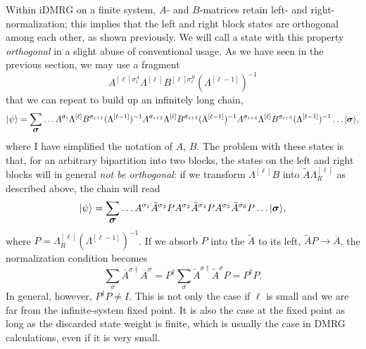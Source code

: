 \documentclass[a4paper,10pt,oneside,onecolumn,1p,times]{elsarticle}
\newcommand{\ket}[1]{\mbox{$| #1  \rangle$}}
\newcommand{\fat}[1]{\mbox{\boldmath$#1$\unboldmath}}	%
\begin{document}
Within iDMRG on a finite system, $A$- and $B$-matrices retain left- and right-normalization; this implies that the left and right block states are orthogonal among each other, as shown previously. We will call a state with this property {\em orthogonal} in a slight abuse of conventional usage. As we have seen in the previous section, we may use a fragment 
\begin{equation}
A^{[\ell]\sigma_\ell^A}\Lambda^{[\ell]} B^{[\ell]\sigma_\ell^B} (\Lambda^{[\ell-1]})^{-1}
\end{equation}
that we can repeat to build up an infinitely long chain,
\begin{equation}
\ket{\psi} = \sum_{\fat{\sigma}} \ldots A^{\sigma_i}\Lambda^{[\ell]} B^{\sigma_{i+1}} (\Lambda^{[\ell-1]})^{-1}A^{\sigma_{i+2}}\Lambda^{[\ell]} B^{\sigma_{i+3}} (\Lambda^{[\ell-1]})^{-1}A^{\sigma_{i+4}}\Lambda^{[\ell]} B^{\sigma_{i+5}} (\Lambda^{[\ell-1]})^{-1} \ldots \ket{\fat{\sigma}} ,
\end{equation}
where I have simplified the notation of $A$, $B$. The problem with these states is that, for an arbitrary bipartition into two blocks, the states on the left and right blocks will in general {\em not be orthogonal}: if we transform $\Lambda^{[\ell]} B$ into $\tilde{A} \Lambda_R^{[\ell]}$ as described above, the chain will read
\begin{equation}
\ket{\psi} = \sum_{\fat{\sigma}} \ldots A^{\sigma_1}\tilde{A}^{\sigma_{2}} P
A^{\sigma_{3}} \tilde{A}^{\sigma_{4}} P A^{\sigma_{5}}\tilde{A}^{\sigma_{6}} P \ldots \ket{\fat{\sigma}} ,
\end{equation}
where $P= \Lambda_R^{[\ell]} (\Lambda^{[\ell-1]})^{-1}$. If we absorb $P$ into the $\tilde{A}$ to its left, $\tilde{A}P \rightarrow \overline{A}$, the normalization condition becomes
\begin{equation}
\sum_\sigma \overline{A}^{\sigma\dagger} \overline{A}^{\sigma} = P^\dagger \sum_\sigma \tilde{A}^{\sigma\dagger} \tilde{A}^\sigma P = P^\dagger P.
\end{equation}
In general, however, $P^\dagger P \neq I$. This is not only the case if $\ell$ is small and we are far from the infinite-system fixed point. It is also the case at the fixed point as long as the discarded state weight is finite, which is usually the case in DMRG calculations, even if it is very small.
\end{document}
